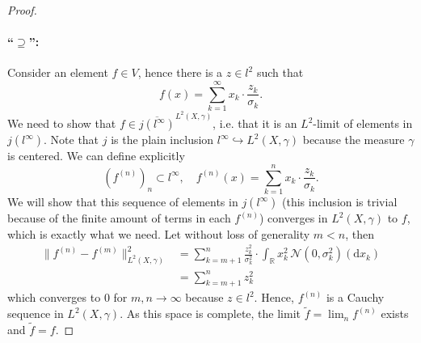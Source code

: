 \documentclass{scrartcl}
\theoremstyle{definition}
\theoremstyle{remark}
\begin{document}
{\begin{proof}
\paragraph{``$\supseteq$'':} Consider an element $f\in V$, hence there is a $z\in l^2$ such that
\[f(x) = \sum_{k=1}^\infty x_k\cdot \frac{z_k}{\sigma_k}.\]
We need to show that $f \in \overline{j(l^\infty)}^{L^2(X,\gamma)}$, i.e. that it is an $L^2$-limit of elements in $j(l^\infty)$. Note that $j$ is the plain inclusion $l^\infty \hookrightarrow L^2(X,\gamma)$ because the measure $\gamma$ is centered. We can define explicitly
\[(f^{(n)})_n \subset l^\infty, \quad f^{(n)}(x) = \sum_{k=1}^n x_k \cdot \frac{z_k}{\sigma_k}.\]
We will show that this sequence of elements in $j(l^\infty)$ (this inclusion is trivial because of the finite amount of terms in each $f^{(n)}$) converges in $L^2(X,\gamma)$ to $f$, which is exactly what we need. Let without loss of generality $m<n$, then
\begin{align*}
\|f^{(n)}-f^{(m)}\|_{L^2(X,\gamma)}^2 &= \sum_{k=m+1}^n \frac{z_k^2}{\sigma_k^2} \cdot \int_{\mathbb R} x_k^2 \,\mathcal N(0, \sigma_k^2)(\mathrm d x_k) \\
&= \sum_{k=m+1}^n z_k^2 
\end{align*}
which converges to $0$ for $m,n\to \infty$ because $z\in l^2$. Hence, $f^{(n)}$ is a Cauchy sequence in $L^2(X,\gamma)$. As this space is complete, the limit $\tilde f = \lim_n f^{(n)}$  exists and $\tilde f = f$.

\end{proof}}
\end{document}
